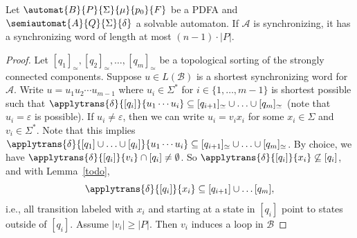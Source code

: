 


\begin{proposition}
 Let $\automat{B}{P}{\Sigma}{\mu}{p_0}{F}$
 be a PDFA and $\semiautomat{A}{Q}{\Sigma}{\delta}$
 a solvable automaton.
 If $\mathcal A$ is synchronizing,
 it has a synchronizing word of length at most $(n - 1)\cdot |P|$.
\end{proposition}
\begin{proof}
 Let $[q_1]_{\simeq}, [q_2]_{\simeq}, \ldots, [q_m]_{\simeq}$
 be a topological sorting of the strongly connected components.
 Suppose $u \in L(\mathcal B)$ is a shortest synchronizing word for $\mathcal A$.
 Write $u = u_1 u_2 \cdots u_{m-1}$ where $u_i \in \Sigma^*$ 
 for $i \in \{1,\ldots,m-1\}$ is shortest possible such that 
 $\applytrans{\delta}{[q_i]}{u_1 \cdots u_i} 
 \subseteq [q_{i+1}]_{\simeq} \cup \ldots \cup [q_m]_{\simeq}$
 (note that $u_i = \varepsilon$ is possible).
 If $u_i \ne \varepsilon$, then we
 can write $u_i = v_i x_i$ for some $x_i \in \Sigma$
 and $v_i \in \Sigma^*$.
 Note that this implies 
 $\applytrans{\delta}{[q_1] \cup \ldots \cup [q_i]}{u_1 \cdots u_i}
 \subseteq [q_{i+1}]_{\simeq} \cup \ldots \cup [q_m]_{\simeq}$.
 By choice, we have $\applytrans{\delta}{[q_i]}{v_i} \cap [q_i] \ne \emptyset$.
 So $\applytrans{\delta}{[q_i]}{x_i} \not\subseteq [q_i]$, and with Lemma~\ref{todo}, 
 \begin{equation}
     \applytrans{\delta}{[q_i]}{x_i} \subseteq [q_{i+1}] \cup \ldots [q_m],
 \end{equation}
 i.e., all transition labeled with $x_i$ and starting at a state in $[q_i]$
 point to states outside of $[q_i]$. %
 Assume $|v_i| \ge |P|$. Then $v_i$ induces a loop in $\mathcal B$

\end{proof}
